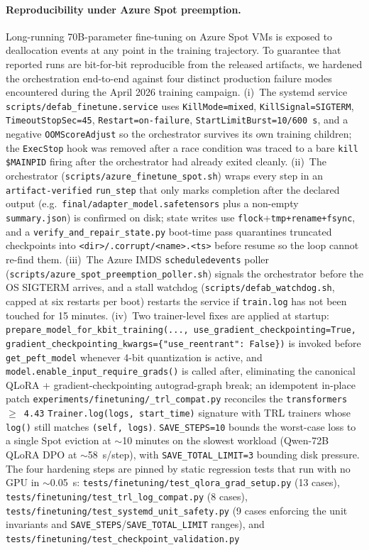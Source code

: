 \documentclass{article}
\theoremstyle{definition}
\begin{document}
\paragraph{Reproducibility under Azure Spot preemption.} Long-running 70B-parameter fine-tuning on Azure Spot VMs is exposed to deallocation events at any point in the training trajectory. To guarantee that reported runs are bit-for-bit reproducible from the released artifacts, we hardened the orchestration end-to-end against four distinct production failure modes encountered during the April 2026 training campaign. (i)~The systemd service \texttt{scripts/defab\_finetune.service} uses \texttt{KillMode=mixed}, \texttt{KillSignal=SIGTERM}, \texttt{TimeoutStopSec=45}, \texttt{Restart=on-failure}, \texttt{StartLimitBurst=10/600\,s}, and a negative \texttt{OOMScoreAdjust} so the orchestrator survives its own training children; the \texttt{ExecStop} hook was removed after a race condition was traced to a bare \texttt{kill \$MAINPID} firing after the orchestrator had already exited cleanly. (ii)~The orchestrator (\texttt{scripts/azure\_finetune\_spot.sh}) wraps every step in an \texttt{artifact-verified} \texttt{run\_step} that only marks completion after the declared output (e.g.\ \texttt{final/adapter\_model.safetensors} plus a non-empty \texttt{summary.json}) is confirmed on disk; state writes use \texttt{flock}+\texttt{tmp+rename+fsync}, and a \texttt{verify\_and\_repair\_state.py} boot-time pass quarantines truncated checkpoints into \texttt{<dir>/.corrupt/<name>.<ts>} before resume so the loop cannot re-find them. (iii)~The Azure IMDS \texttt{scheduledevents} poller (\texttt{scripts/azure\_spot\_preemption\_poller.sh}) signals the orchestrator before the OS SIGTERM arrives, and a stall watchdog (\texttt{scripts/defab\_watchdog.sh}, capped at six restarts per boot) restarts the service if \texttt{train.log} has not been touched for 15 minutes. (iv)~Two trainer-level fixes are applied at startup: \texttt{prepare\_model\_for\_kbit\_training(...,\ use\_gradient\_checkpointing=True,\ gradient\_checkpointing\_kwargs=\{"use\_reentrant":\ False\})} is invoked before \texttt{get\_peft\_model} whenever 4-bit quantization is active, and \texttt{model.enable\_input\_require\_grads()} is called after, eliminating the canonical QLoRA + gradient-checkpointing autograd-graph break; an idempotent in-place patch \texttt{experiments/finetuning/\_trl\_compat.py} reconciles the \texttt{transformers $\geq$ 4.43} \texttt{Trainer.log(logs, start\_time)} signature with TRL trainers whose \texttt{log()} still matches \texttt{(self, logs)}. \texttt{SAVE\_STEPS=10} bounds the worst-case loss to a single Spot eviction at $\sim$10 minutes on the slowest workload (Qwen-72B QLoRA DPO at $\sim$58~s/step), with \texttt{SAVE\_TOTAL\_LIMIT=3} bounding disk pressure. The four hardening steps are pinned by static regression tests that run with no GPU in $\sim$0.05~s: \texttt{tests/finetuning/test\_qlora\_grad\_setup.py} (13 cases), \texttt{tests/finetuning/test\_trl\_log\_compat.py} (8 cases), \texttt{tests/finetuning/test\_systemd\_unit\_safety.py} (9 cases enforcing the unit invariants and \texttt{SAVE\_STEPS}/\texttt{SAVE\_TOTAL\_LIMIT} ranges), and \texttt{tests/finetuning/test\_checkpoint\_validation.py} 
\end{document}

